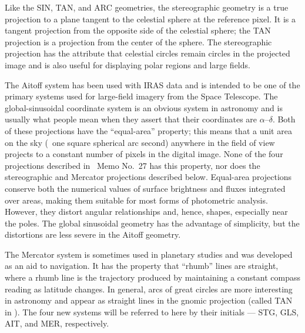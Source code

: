      Like the SIN, TAN, and ARC geometries, the stereographic geometry
is a true projection to a plane tangent to the celestial sphere at the
reference pixel.  It is a tangent projection from the opposite side of
the celestial sphere; the TAN projection is a projection from the
center  of the sphere.  The stereographic projection has the attribute
that celestial circles remain circles in the projected image and is
also useful for displaying polar regions and large fields.

   The Aitoff system has been used with IRAS data and is intended to
be one of the primary systems used for large-field imagery from the
Space Telescope.  The global-sinusoidal coordinate system is an
obvious system in astronomy and is usually what people mean when they
assert that their coordinates are $\alpha$--$\delta$.  Both of these
projections have the ``equal-area'' property; this means that a unit
area on the sky (\eg\ one square spherical arc second) anywhere in the
field of view projects to a constant number of pixels in the digital
image.  None of the four projections described in \AIPS\ Memo No.~27
has this property, nor does the stereographic and Mercator projections
described below.  Equal-area projections conserve both the numerical
values of surface brightness and fluxes integrated over areas, making
them suitable for most forms of photometric analysis.  However, they
distort angular relationships and, hence, shapes, especially near the
poles.  The global sinusoidal geometry has the advantage of
simplicity, but the distortions are less severe in the Aitoff geometry.

     The Mercator system is sometimes used in planetary studies and
was developed as an aid to navigation.  It has the property that
``rhumb'' lines are straight, where a rhumb line is the trajectory
produced by maintaining a constant compass reading as latitude
changes.  In general, arcs of great circles are more interesting in
astronomy and appear as straight lines in the gnomic projection
(called TAN in \AIPS).  The four new systems will be referred to here
by their initials --- STG, GLS, AIT, and MER, respectively.

